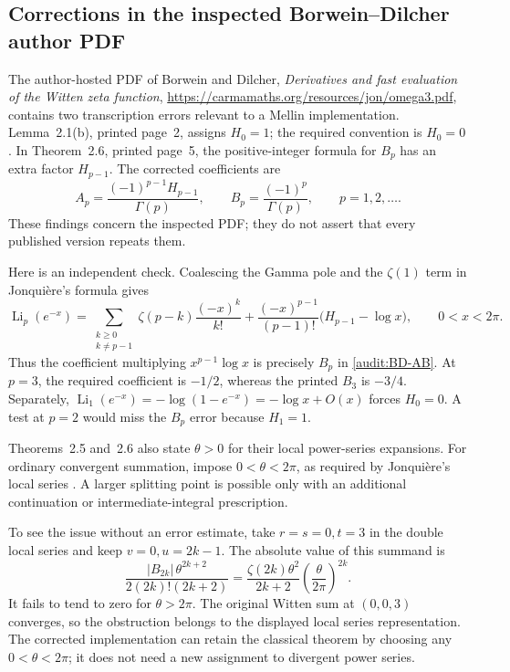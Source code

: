 \subsection{Corrections in the inspected Borwein--Dilcher author PDF}
\label{audit:BD}

The author-hosted PDF of Borwein and Dilcher,
\emph{Derivatives and fast evaluation of the Witten zeta function},
\url{https://carmamaths.org/resources/jon/omega3.pdf}, contains two
transcription errors relevant to a Mellin implementation.  Lemma~2.1(b),
printed page~2, assigns $H_0=1$; the required convention is $H_0=0$.
In Theorem~2.6, printed page~5, the positive-integer formula for $B_p$
has an extra factor $H_{p-1}$.  The corrected coefficients are
\begin{equation}\label{audit:BD-AB}
 A_p=\frac{(-1)^{p-1}H_{p-1}}{\Gamma(p)},\qquad
 B_p=\frac{(-1)^p}{\Gamma(p)},\qquad p=1,2,\ldots.
\end{equation}
These findings concern the inspected PDF; they do not assert that every
published version repeats them.

Here is an independent check.  Coalescing the Gamma pole and the
$\zeta(1)$ term in Jonqui\`ere's formula gives
\begin{equation}\label{audit:integer-Jonquiere}
 \operatorname{Li}_p(e^{-x})
 =\sum_{\substack{k\ge0\\k\ne p-1}}
       \zeta(p-k)\frac{(-x)^k}{k!}
 +\frac{(-x)^{p-1}}{(p-1)!}\bigl(H_{p-1}-\log x\bigr),
 \qquad 0<x<2\pi.
\end{equation}
Thus the coefficient multiplying $x^{p-1}\log x$ is precisely $B_p$
in \eqref{audit:BD-AB}.  At $p=3$, the required coefficient is $-1/2$,
whereas the printed $B_3$ is $-3/4$.  Separately,
$\operatorname{Li}_1(e^{-x})=-\log(1-e^{-x})=-\log x+O(x)$ forces
$H_0=0$.  A test at $p=2$ would miss the $B_p$ error because $H_1=1$.

Theorems~2.5 and~2.6 also state $\theta>0$ for their local power-series
expansions.  For ordinary convergent summation, impose
$0<\theta<2\pi$, as required by Jonqui\`ere's local series
\cite[25.12.12]{DLMFpolylog}.  A larger splitting point is possible only
with an additional continuation or intermediate-integral prescription.

To see the issue without an error estimate, take $r=s=0,t=3$ in the
double local series and keep $v=0,u=2k-1$.  The absolute value of this
summand is
\[
 \frac{|B_{2k}|\,\theta^{2k+2}}{2(2k)!(2k+2)}
 =\frac{\zeta(2k)\theta^2}{2k+2}
                       \left(\frac\theta{2\pi}\right)^{2k}.
\]
It fails to tend to zero for $\theta>2\pi$.  The original Witten sum at
$(0,0,3)$ converges, so the obstruction belongs to the displayed local
series representation.  The corrected implementation can retain the
classical theorem by choosing any $0<\theta<2\pi$; it does not need a
new assignment to divergent power series.
